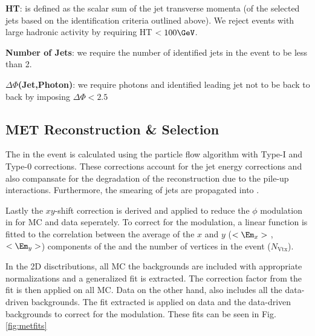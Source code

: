 {\bf HT}: is defined as the scalar sum of the jet transverse momenta (of the selected jets based on the identification criteria outlined above). We reject events with large hadronic activity by requiring HT $<100 \GeV$.

{\bf Number of Jets}: we require the number of identified jets in the event to be less than 2.

{\bf $\Delta\Phi$(Jet,Photon)}: we require photons and identified leading jet not to be back to back by imposing  $\Delta\Phi < 2.5$ 


\subsection{MET Reconstruction \& Selection}
\label{sec:met}

The \met in the event is calculated using the particle flow algorithm with Type-I and Type-0 corrections. These corrections account for the jet energy corrections and also compansate for the degradation of the \met reconstruction due to the pile-up interactions. Furthermore, the smearing of jets are propagated into \met. 

Lastly the $xy$-shift correction is derived and applied to reduce the $\phi$ modulation in \met for MC and data seperately. To correct for the modulation, a linear function is fitted to the correlation between the average of the $x$ and $y$ ($<\Em_x>$ , $<\Em_y>$) components of the \met and the number of vertices in the event ($N_\mathrm{Vtx}$). %



In the 2D disctributions, all MC the backgrounds are included with appropriate normalizations and a generalized fit is extracted. The correction factor from the fit is then applied on all MC. Data on the other hand, also includes all the data-driven backgrounds. The fit extracted is applied on data and the data-driven backgrounds to correct for the modulation. These fits can be seen in Fig. \ref{fig:metfits}

